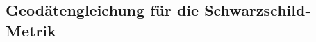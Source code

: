 \subsection{Geodätengleichung für die Schwarzschild-Metrik}
\label{skript:schwarzschild:geodaetengleichung}
